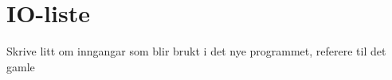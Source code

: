 \section{IO-liste}
\thispagestyle{fancy}

Skrive litt om inngangar som blir brukt i det nye programmet, referere til det gamle